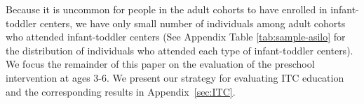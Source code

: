 Because it is uncommon for people in the adult cohorts to have enrolled in infant-toddler centers, we have only small number of individuals among adult cohorts who attended infant-toddler centers (See Appendix Table \ref{tab:sample-asilo} for the distribution of individuals who attended each type of infant-toddler centers). We focus the remainder of this paper on the evaluation of the preschool intervention at ages 3-6. We present our strategy for evaluating ITC education and the corresponding results in Appendix~\ref{sec:ITC}.

%
